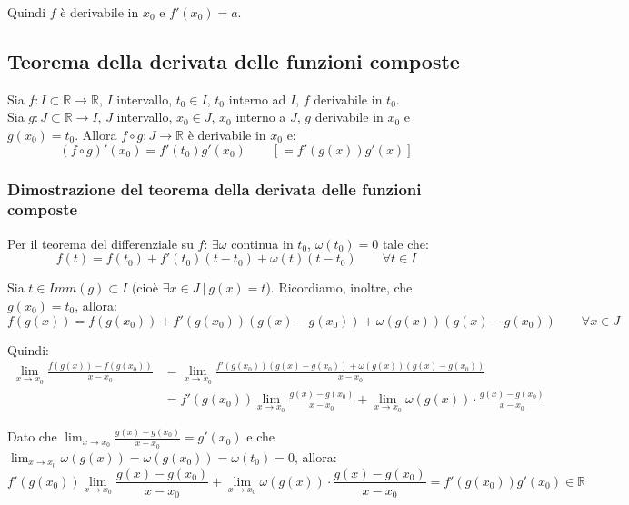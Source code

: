 \documentclass{article}
\begin{document}
\noindent Quindi $f$ è derivabile in $x_0$ e $f'(x_0) = a$.

\subsection{Teorema della derivata delle funzioni composte}
Sia $f: I \subset \mathbb{R} \xrightarrow{} \mathbb{R}$, $I$ intervallo, $t_0 \in I$, $t_0$ interno ad $I$, $f$ derivabile in $t_0$.\\
Sia $g: J \subset \mathbb{R} \xrightarrow{} I$, $J$ intervallo, $x_0 \in J$, $x_0$ interno a $J$, $g$ derivabile in $x_0$ e $g(x_0) = t_0$. Allora $f \circ g: J \xrightarrow{} \mathbb{R}$ è derivabile in $x_0$ e:
\begin{equation*}
    (f \circ g)'(x_0) = f'(t_0)g'(x_0) \qquad [= f'(g(x))g'(x)]
\end{equation*}

\subsubsection{Dimostrazione del teorema della derivata delle funzioni composte}
Per il teorema del differenziale su $f$: $\exists \omega$ continua in $t_0$, $\omega(t_0) = 0$ tale che:
\begin{equation*}
    f(t) = f(t_0) + f'(t_0)(t - t_0) + \omega(t)(t - t_0) \qquad \forall t \in I
\end{equation*}

\noindent Sia $t \in Imm(g) \subset I$ (cioè $\exists x \in J \ | \ g(x) = t$). Ricordiamo, inoltre, che $g(x_0) = t_0$, allora:
\begin{equation*}
    f(g(x)) = f(g(x_0)) + f'(g(x_0))(g(x) - g(x_0)) + \omega(g(x))(g(x) - g(x_0)) \qquad \forall x \in J
\end{equation*}

\noindent Quindi:
\begin{align*}
    \lim_{x \to x_0} \frac{f(g(x)) - f(g(x_0))}{x - x_0} &= \lim_{x \to x_0} \frac{f'(g(x_0))(g(x) - g(x_0)) + \omega(g(x))(g(x) - g(x_0))}{x - x_0}\\
    &= f'(g(x_0)) \lim_{x \to x_0} \frac{g(x) - g(x_0)}{x - x_0} + \lim_{x \to x_0} \omega(g(x)) \cdot \frac{g(x) - g(x_0)}{x - x_0}
\end{align*}

\noindent Dato che $\lim_{x \to x_0} \frac{g(x) - g(x_0)}{x - x_0} = g'(x_0)$ e che $\lim_{x \to x_0} \omega(g(x)) = \omega(g(x_0)) = \omega(t_0) = 0$, allora:
\begin{equation*}
    f'(g(x_0)) \lim_{x \to x_0} \frac{g(x) - g(x_0)}{x - x_0} + \lim_{x \to x_0} \omega(g(x)) \cdot \frac{g(x) - g(x_0)}{x - x_0} = f'(g(x_0))g'(x_0) \in \mathbb{R}
\end{equation*}
\end{document}
